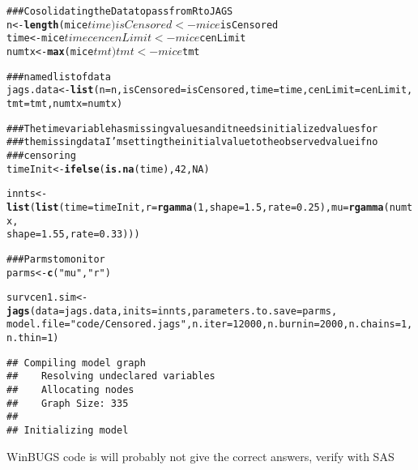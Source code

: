 \documentclass[12pt,letterpaper,oneside]{article}\usepackage{graphicx, color}
\makeatletter
\newcommand{\hlfunctioncall}[1]{\textcolor[rgb]{0.501960784313725,0,0.329411764705882}{\textbf{#1}}}%
\newcommand{\hlstring}[1]{\textcolor[rgb]{0.6,0.6,1}{#1}}%
\newcommand{\hlcomment}[1]{\textcolor[rgb]{0.180392156862745,0.6,0.341176470588235}{#1}}%
\newenvironment{kframe}{%
 \def\at@end@of@kframe{}%
 \ifinner\ifhmode%
  \def\at@end@of@kframe{\end{minipage}}%
  \begin{minipage}{\columnwidth}%
 \fi\fi%
 \def\FrameCommand##1{\hskip\@totalleftmargin \hskip-\fboxsep
 \colorbox{shadecolor}{##1}\hskip-\fboxsep
     \hskip-\linewidth \hskip-\@totalleftmargin \hskip\columnwidth}%
 \MakeFramed {\advance\hsize-\width
   \@totalleftmargin\z@ \linewidth\hsize
   \@setminipage}}%
 {\par\unskip\endMakeFramed%
 \at@end@of@kframe}
\newenvironment{knitrout}{}{} %
\makeatother
\begin{document}
\begin{knitrout}\scriptsize
{}\color{fgcolor}\begin{kframe}
\begin{alltt}
\hlcomment{### Cosolidating the Data to pass from R to JAGS}
n <- \hlfunctioncall{length}(mice$time)
isCensored <- mice$isCensored
time <- mice$timecen
cenLimit <- mice$cenLimit
numtx <- \hlfunctioncall{max}(mice$tmt)
tmt <- mice$tmt

\hlcomment{### named list of data}
jags.data <- \hlfunctioncall{list}(n = n, isCensored = isCensored, time = time, cenLimit = cenLimit, 
    tmt = tmt, numtx = numtx)

\hlcomment{### The time variable has missing values and it needs initialized values for}
\hlcomment{### the missing data I'm setting the initial value to the observed value if no}
\hlcomment{### censoring}
timeInit <- \hlfunctioncall{ifelse}(\hlfunctioncall{is.na}(time), 42, NA)

innts <- \hlfunctioncall{list}(\hlfunctioncall{list}(time = timeInit, r = \hlfunctioncall{rgamma}(1, shape = 1.5, rate = 0.25), mu = \hlfunctioncall{rgamma}(numtx, 
    shape = 1.55, rate = 0.33)))

\hlcomment{### Parms to monitor}
parms <- \hlfunctioncall{c}(\hlstring{"mu"}, \hlstring{"r"})

survcen1.sim <- \hlfunctioncall{jags}(data = jags.data, inits = innts, parameters.to.save = parms, 
    model.file = \hlstring{"code/Censored.jags"}, n.iter = 12000, n.burnin = 2000, n.chains = 1, 
    n.thin = 1)
\end{alltt}


{\ttfamily\noindent\itshape\color{messagecolor}{\#\# module glm loaded}}\begin{verbatim}
## Compiling model graph
##    Resolving undeclared variables
##    Allocating nodes
##    Graph Size: 335
## 
## Initializing model
\end{verbatim}
\end{kframe}
\end{knitrout}


WinBUGS code is will probably not give the correct answers, verify with SAS
\end{document}
